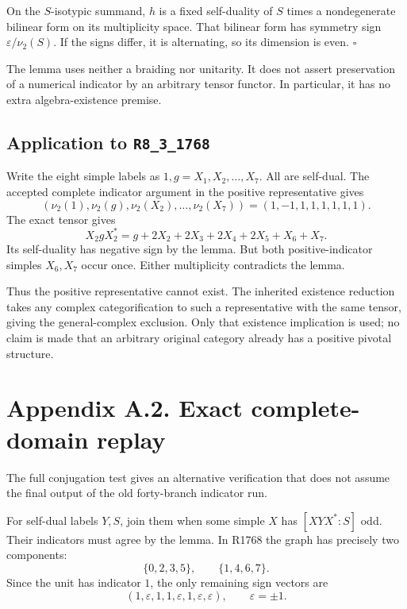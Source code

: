 \documentclass[11pt,a4paper]{article}
\newcommand{\R}[1]{\texttt{#1}}
\begin{document}
On the \(S\)-isotypic summand, \(h\) is a fixed self-duality of \(S\) times a nondegenerate bilinear form on its multiplicity space. That bilinear form has symmetry sign \(\varepsilon/\nu_2(S)\). If the signs differ, it is alternating, so its dimension is even. \(\square\)

The lemma uses neither a braiding nor unitarity. It does not assert preservation of a numerical indicator by an arbitrary tensor functor. In particular, it has no extra algebra-existence premise.

\subsection*{Application to \R{R8\_3\_1768}}
Write the eight simple labels as \(1,g=X_1,X_2,\ldots,X_7\). All are self-dual. The accepted complete indicator argument in the positive representative gives
\[
(\nu_2(1),\nu_2(g),\nu_2(X_2),\ldots,\nu_2(X_7))
=(1,-1,1,1,1,1,1,1).
\]
The exact tensor gives
\[
X_2gX_2^*
 =g+2X_2+2X_3+2X_4+2X_5+X_6+X_7.
\]
Its self-duality has negative sign by the lemma. But both positive-indicator simples \(X_6,X_7\) occur once. Either multiplicity contradicts the lemma.

Thus the positive representative cannot exist. The inherited existence reduction takes any complex categorification to such a representative with the same tensor, giving the general-complex exclusion. Only that existence implication is used; no claim is made that an arbitrary original category already has a positive pivotal structure.
\newpage
\section*{Appendix A.2. Exact complete-domain replay}

The full conjugation test gives an alternative verification that does not assume the final output of the old forty-branch indicator run.

For self-dual labels \(Y,S\), join them when some simple \(X\) has
\([XYX^*:S]\) odd. Their indicators must agree by the lemma. In R1768 the graph has precisely two components:
\[
\{0,2,3,5\},\qquad \{1,4,6,7\}.
\]
Since the unit has indicator \(1\), the only remaining sign vectors are
\[
(1,\varepsilon,1,1,\varepsilon,1,\varepsilon,\varepsilon),
\qquad \varepsilon=\pm1.
\]
\end{document}
